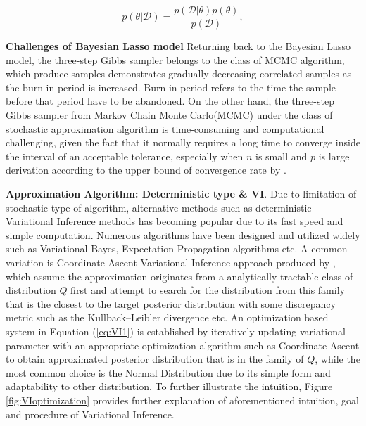 \begin{equation}
	p(\theta|\mathcal{D}) = \frac{p(\mathcal{D}|\theta)p(\theta)}{p(\mathcal{D})},
	\label{eq:Bayesrule}
\end{equation}

\textbf{Challenges of Bayesian Lasso model}
 Returning back to the Bayesian Lasso model, the three-step Gibbs sampler belongs to the class of MCMC algorithm, which produce samples demonstrates gradually decreasing correlated samples as the burn-in period is increased. Burn-in period refers to the time the sample before that period have to be abandoned. On the other hand, the three-step Gibbs sampler from Markov Chain Monte Carlo(MCMC) under the class of stochastic approximation algorithm is time-consuming and computational challenging, given the fact that it normally requires a long time to converge inside the interval of an acceptable tolerance, especially when $n$ is small and $p$ is large derivation according to the upper bound of convergence rate by \cite{rajaratnam_sparks_2015}. 


\textbf{Approximation Algorithm: Deterministic type \& VI}.
 Due to limitation of stochastic type of algorithm, alternative methods such as deterministic Variational Inference methods has becoming popular due to its fast speed and simple computation. 
 Numerous algorithms have been designed and utilized widely such as Variational Bayes, Expectation Propagation algorithms etc. A common variation is Coordinate Ascent Variational Inference approach produced by \cite{Blei2003LDA} , which assume the approximation originates from a analytically tractable class of distribution $Q$ first and attempt to search for the distribution from this family that is the closest to the target posterior distribution with some discrepancy metric such as the Kullback–Leibler divergence etc.  
 An optimization based system in Equation (\ref{eq:VI1}) is established by iteratively updating variational parameter with an appropriate optimization algorithm such as Coordinate Ascent to obtain approximated posterior distribution that is in the family of $Q$, while the most common choice is the Normal Distribution due to its simple form and adaptability to other distribution.
 To further illustrate the intuition, Figure \ref{fig:VIoptimization} provides further explanation of aforementioned intuition, goal and procedure of Variational Inference.
 
